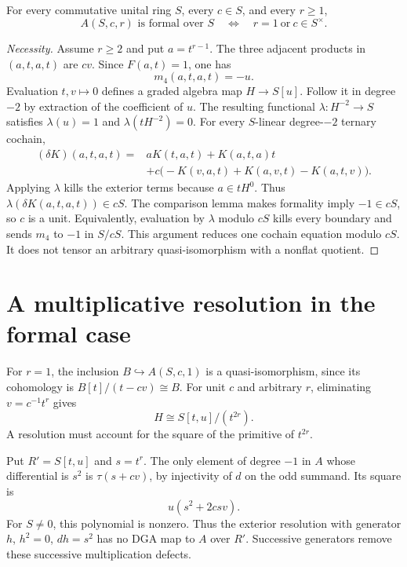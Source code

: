 \begin{theorem}
\label{v4-arith:ks:coefficient-formality}
\ClaimStatusProvedHere{}
For every commutative unital ring $S$, every $c\in S$, and every $r\geq1$,
\[
 \boxed{\quad A(S,c,r)\text{ is formal over }S
       \quad\Longleftrightarrow\quad r=1\ \text{or}\ c\in S^\times.\quad}
\]
\end{theorem}

\begin{proof}[Necessity]
Assume $r\geq2$ and put $a=t^{r-1}$.
The three adjacent products in $(a,t,a,t)$ are $cv$.
Since $F(a,t)=1$, one has
\[
 m_4(a,t,a,t)=-u.
\]
Evaluation $t,v\mapsto0$ defines a graded algebra map $H\to S[u]$.
Follow it in degree $-2$ by extraction of the coefficient of $u$.
The resulting functional $\lambda:H^{-2}\to S$ satisfies
$\lambda(u)=1$ and $\lambda(tH^{-2})=0$.
For every $S$-linear degree-$-2$ ternary cochain,
\[
 \begin{split}
 (\delta K)(a,t,a,t)={}&aK(t,a,t)+K(a,t,a)t\\
 &+c\bigl(-K(v,a,t)+K(a,v,t)-K(a,t,v)\bigr).
 \end{split}
\]
Applying $\lambda$ kills the exterior terms because $a\in tH^0$.
Thus $\lambda(\delta K(a,t,a,t))\in cS$.
The comparison lemma makes formality imply $-1\in cS$, so $c$ is a unit.
Equivalently, evaluation by $\lambda$ modulo $cS$ kills every boundary
and sends $m_4$ to $-1$ in $S/cS$.
This argument reduces one cochain equation modulo $cS$.
It does not tensor an arbitrary quasi-isomorphism with a nonflat quotient.
\end{proof}

\section{A multiplicative resolution in the formal case}
\label{v4-arith:ks:positive-resolution}

For $r=1$, the inclusion $B\hookrightarrow A(S,c,1)$ is a quasi-isomorphism,
since its cohomology is $B[t]/(t-cv)\cong B$.
For unit $c$ and arbitrary $r$, eliminating $v=c^{-1}t^r$ gives
\[
 H\cong S[t,u]/(t^{2r}).
\]
A resolution must account for the square of the primitive of $t^{2r}$.

Put $R'=S[t,u]$ and $s=t^r$.
The only element of degree $-1$ in $A$ whose differential is $s^2$ is
$\tau(s+cv)$, by injectivity of $d$ on the odd summand.
Its square is
\[
 u(s^2+2csv).
\]
For $S\ne0$, this polynomial is nonzero.
Thus the exterior resolution with generator $h$, $h^2=0$, $dh=s^2$
has no DGA map to $A$ over $R'$.
Successive generators remove these successive multiplication defects.

